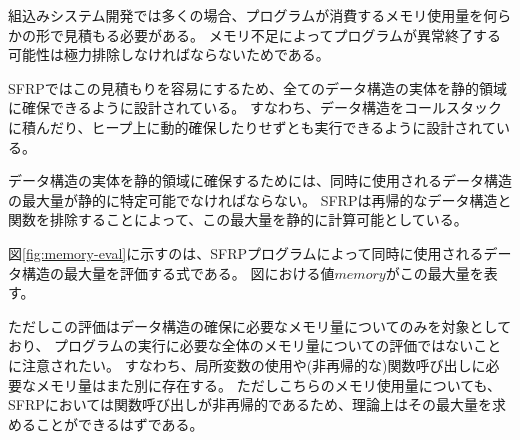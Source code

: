 組込みシステム開発では多くの場合、プログラムが消費するメモリ使用量を何らかの形で見積もる必要がある。
メモリ不足によってプログラムが異常終了する可能性は極力排除しなければならないためである。

SFRPではこの見積もりを容易にするため、全てのデータ構造の実体を静的領域に確保できるように設計されている。
すなわち、データ構造をコールスタックに積んだり、ヒープ上に動的確保したりせずとも実行できるように設計されている。

データ構造の実体を静的領域に確保するためには、同時に使用されるデータ構造の最大量が静的に特定可能でなければならない。
SFRPは再帰的なデータ構造と関数を排除することによって、この最大量を静的に計算可能としている。

図\ref{fig:memory-eval}に示すのは、SFRPプログラムによって同時に使用されるデータ構造の最大量を評価する式である。
図における値$memory$がこの最大量を表す。

ただしこの評価はデータ構造の確保に必要なメモリ量についてのみを対象としており、
プログラムの実行に必要な全体のメモリ量についての評価ではないことに注意されたい。
すなわち、局所変数の使用や(非再帰的な)関数呼び出しに必要なメモリ量はまた別に存在する。
ただしこちらのメモリ使用量についても、SFRPにおいては関数呼び出しが非再帰的であるため、理論上はその最大量を求めることができるはずである。



